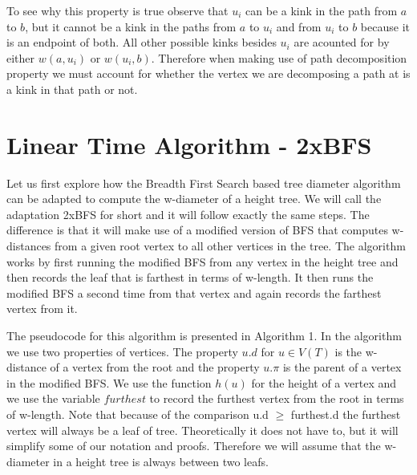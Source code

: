 To see why this property is true observe that $u_i$ can be a kink in the path from $a$ to $b$, but it cannot be a kink in the paths from $a$ to $u_i$ and from $u_i$ to $b$ because it is an endpoint of both. All other possible kinks besides $u_i$ are acounted for by either $w(a, u_i)$ or $w(u_i, b)$. Therefore when making use of path decomposition property we must account for whether the vertex we are decomposing a path at is a kink in that path or not.


\section{Linear Time Algorithm - 2xBFS}

Let us first explore how the Breadth First Search based tree diameter algorithm can be adapted to compute the w-diameter of a height tree. We will call the adaptation 2xBFS for short and it will follow exactly the same steps. The difference is that it will make use of a modified version of BFS that computes w-distances from a given root vertex to all other vertices in the tree. The algorithm works by first running the modified BFS from any vertex in the height tree and then records the leaf that is farthest in terms of w-length. It then runs the modified BFS a second time from that vertex and again records the farthest vertex from it.

The pseudocode for this algorithm is presented in Algorithm 1. In the algorithm we use two properties of vertices. The property $u.d$ for $u \in V(T)$ is the w-distance of a vertex from the root and the property $u.\pi$ is the parent of a vertex in the modified BFS. We use the function $h(u)$ for the height of a vertex and we use the variable $furthest$ to record the furthest vertex from the root in terms of w-length. Note that because of the comparison u.d $\ge$ furthest.d the furthest vertex will always be a leaf of tree. Theoretically it does not have to, but it will simplify some of our notation and proofs. Therefore we will assume that the w-diameter in a height tree is always between two leafs.

